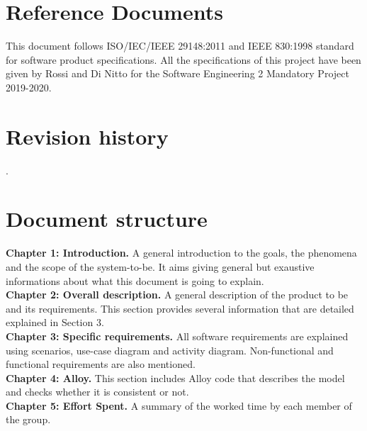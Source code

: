 \documentclass[../RASD.tex]{subfiles}
\begin{document}
    \section{Reference Documents}\label{sec:reference-documents}
    This document follows ISO/IEC/IEEE 29148:2011 and IEEE 830:1998 standard for software product specifications.
    All the specifications of this project have been given by Rossi and Di Nitto for the Software Engineering 2 Mandatory Project 2019-2020.

    \section{Revision history}\label{sec:revision-history}
    .

    \section{Document structure}\label{sec:document-structure}
    \textbf{Chapter 1: Introduction.} A general introduction to the goals, the phenomena and the scope of the system-to-be. It aims giving general but exaustive informations about what this document is going to explain.
    \\
    \textbf{Chapter 2: Overall description.} A general description of the product to be and its requirements. This section provides several information that are detailed explained in Section 3.
    \\
    \textbf{Chapter 3: Specific requirements.} All software requirements are explained using scenarios, use-case diagram and activity diagram. Non-functional and functional requirements are also mentioned.
    \\
    \textbf{Chapter 4: Alloy.} This section includes Alloy code that describes the model and checks whether it is consistent or not.
    \\
    \textbf{Chapter 5: Effort Spent.} A summary of the worked time by each member of the group.
\end{document}
